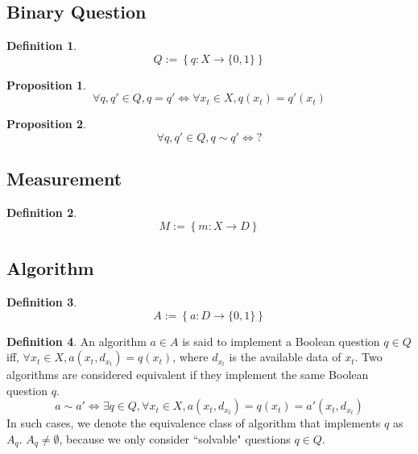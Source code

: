 \documentclass[11pt,a4paper]{article}
\newtheorem{pro}{Proposition}[section]
\theoremstyle{definition}
\newtheorem{defn}{Definition}[section]
\theoremstyle{remark}
\numberwithin{equation}{section}
\newcommand{\set}[1]{\left\lbrace #1 \right\rbrace}
\begin{document}
\subsection{Binary Question}
\begin{defn}
\begin{equation}
Q:= \set{q: X \rightarrow \{0, 1\}}
\end{equation}
\end{defn}

\begin{pro}
\begin{equation}
\forall q,q'\in Q, q=q' \iff  \forall x_t \in X, q(x_t) = q'(x_t)
\end{equation}
\end{pro}

\begin{pro}
\begin{equation}
\forall q,q'\in Q, q\sim q' \iff ?
\end{equation}
\end{pro}


\subsection{Measurement}
\begin{defn}
\begin{equation}
M:=\set{m:X \rightarrow D}
\end{equation}
\end{defn}

\subsection{Algorithm}
\begin{defn}
\begin{equation}
A := \set{a: D \rightarrow \{0, 1\}}
\end{equation}
\end{defn}


\begin{defn}
An algorithm \( a \in A  \) is said to implement a Boolean question \( q \in Q  \) iff, $\forall  x_t \in X , a(x_t, d_{x_t}) = q(x_t) $, where $d_{x_t}$ is the available data of $x_t$.
Two algorithms are considered equivalent if they implement the same Boolean question $q$. 
\begin{equation}
a \sim a' \iff  
\exists q\in Q, \forall  x_t \in X , a(x_t, d_{x_t}) = q(x_t)  =a'(x_t, d_{x_t})
\end{equation}
In such cases, we denote the equivalence class of algorithm that implements $q$ as \( A_q \).
$A_q \neq \emptyset$, because we only consider ``solvable" questions $q\in Q$. 
\end{defn}
\end{document}
